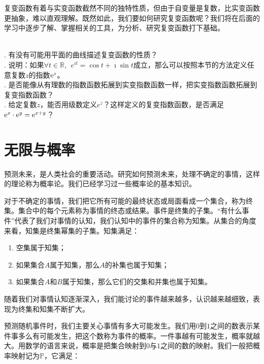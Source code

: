 \documentclass[12pt,UTF8,fontset=none]{ctexbook}
\begin{document}
复变函数有着与实变函数截然不同的独特性质，但由于自变量是复数，比实变函数更抽象，难以直观理解。既然如此，我们要如何研究复变函数呢？我们将在后面的学习中逐步了解、掌握相关的工具，为分析、研究复变函数打下基础。

\begin{sk}
    \mbox{} \\
    . 有没有可能用平面的曲线描述复变函数的性质？\\
    . 说明：如果$\forall t\in\mathbb{R}, \;\,e^{it} = \cos{t} + \imath \sin{t}$成立，那么可以按照本节的方法定义任意复数$z$的指数$\mathrm{e}^z$。\\
    . 是否能像从有理数的指数函数拓展到实变指数函数一样，把实变指数函数拓展到复变指数函数？\\
    . 给定复数$z$，能否用级数定义$e^z$？这样定义的复变指数函数，是否满足$\mathrm{e}^x\cdot \mathrm{e}^y = \mathrm{e}^{x + y}$？
\end{sk}


\chapter{无限与概率}

预测未来，是人类社会的重要活动。研究如何预测未来，处理不确定的事情，这样的理论称为概率论。我们已经学习过一些概率论的基本知识。

对于不确定的事情，我们把它所有可能的最终状态或局面看成一个集合，称为终集。集合中的每个元素称为事情的终态或结果。事件是终集的子集。“有什么事件”代表了我们对事情的认知，我们认知中的事件的集合称为知集。从集合的角度来看，知集是终集幂集的子集。知集满足：

\begin{enumerate}
    \item 空集属于知集；
    \item 如果集合$A$属于知集，那么$A$的补集也属于知集；
    \item 如果集合$A$和$B$属于知集，那么它们的交集和并集也属于知集。
\end{enumerate}

随着我们对事情认知逐渐深入，我们能讨论的事件越来越多，认识越来越细致，表现为终集和知集不断扩大。

预测随机事件时，我们主要关心事情有多大可能发生。我们用$0$到$1$之间的数表示某件事多么有可能发生，把这个数称为事件的概率。一件事越有可能发生，概率就越大。用数学的语言来说，概率是把集合映射到$0$与$1$之间的数的映射。我们一般把概率映射记为$\mathbb{P}$，它满足：
\end{document}

